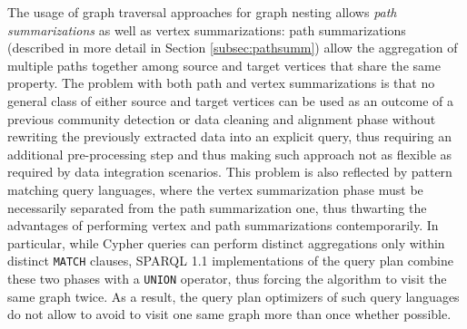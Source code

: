 The usage of graph traversal approaches for graph nesting allows \textit{path summarizations} as well as vertex summarizations: path summarizations (described in more detail in Section \vref{subsec:pathsumm}) allow the aggregation of multiple paths together among source and target vertices that share the same property. The problem with both path and vertex summarizations is that no general class of either source and target vertices can be used as an outcome of a previous community detection \cite{xie,berlingerio11} or data cleaning and alignment phase \cite{ALIEH17} without rewriting the previously extracted data into an explicit query, thus requiring an additional pre-processing step and thus making such approach not as flexible as required by data integration scenarios. %
 This problem is also reflected by pattern matching query languages, where the vertex summarization phase must be necessarily separated from the path summarization one, thus thwarting the advantages of performing vertex and path summarizations contemporarily. In particular, while Cypher queries can perform distinct aggregations only within distinct \texttt{MATCH} clauses, SPARQL 1.1 implementations of the query plan combine these two phases with a \texttt{UNION} operator, thus forcing the algorithm to visit the same graph twice. As a result, the query plan optimizers of such query languages do not allow to avoid to visit one same graph more than once whether possible.  

